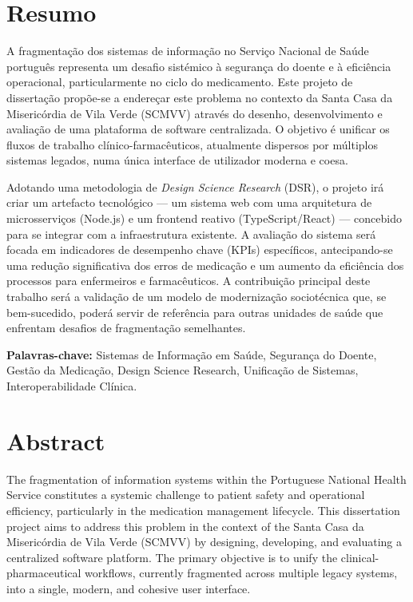 \chapter*{Resumo}

A fragmentação dos sistemas de informação no Serviço Nacional de Saúde português representa um desafio sistémico à segurança do doente e à eficiência operacional, particularmente no ciclo do medicamento. Este projeto de dissertação propõe-se a endereçar este problema no contexto da Santa Casa da Misericórdia de Vila Verde (SCMVV) através do desenho, desenvolvimento e avaliação de uma plataforma de software centralizada. O objetivo é unificar os fluxos de trabalho clínico-farmacêuticos, atualmente dispersos por múltiplos sistemas legados, numa única interface de utilizador moderna e coesa.

Adotando uma metodologia de \textit{Design Science Research} (DSR), o projeto irá criar um artefacto tecnológico — um sistema web com uma arquitetura de microsserviços (Node.js) e um frontend reativo (TypeScript/React) — concebido para se integrar com a infraestrutura existente. A avaliação do sistema será focada em indicadores de desempenho chave (KPIs) específicos, antecipando-se uma redução significativa dos erros de medicação e um aumento da eficiência dos processos para enfermeiros e farmacêuticos. A contribuição principal deste trabalho será a validação de um modelo de modernização sociotécnica que, se bem-sucedido, poderá servir de referência para outras unidades de saúde que enfrentam desafios de fragmentação semelhantes.

\vspace{6mm}
\noindent\textbf{Palavras-chave:} Sistemas de Informação em Saúde, Segurança do Doente, Gestão da Medicação, Design Science Research, Unificação de Sistemas, Interoperabilidade Clínica.

\vspace*{\fill}

\chapter*{Abstract}

The fragmentation of information systems within the Portuguese National Health Service constitutes a systemic challenge to patient safety and operational efficiency, particularly in the medication management lifecycle. This dissertation project aims to address this problem in the context of the Santa Casa da Misericórdia de Vila Verde (SCMVV) by designing, developing, and evaluating a centralized software platform. The primary objective is to unify the clinical-pharmaceutical workflows, currently fragmented across multiple legacy systems, into a single, modern, and cohesive user interface.

